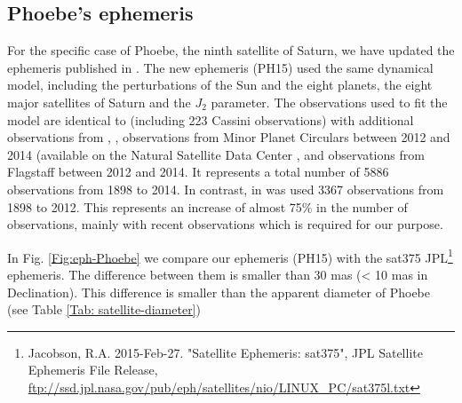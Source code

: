 \documentclass[useAMS,usenatbib]{mn2e}
\begin{document}


\subsection{Phoebe's ephemeris}

For the specific case of Phoebe, the ninth satellite of Saturn, we have updated the ephemeris published in \cite{Desmars2013}. The new ephemeris (PH15) used the same dynamical model, including the perturbations of the Sun and the eight planets, the eight major satellites of Saturn and the $J_2$ parameter. The observations used to fit the model are identical to \cite{Desmars2013} (including 223 Cassini observations) with additional observations from , \cite{Peng2015}, observations from Minor Planet Circulars between 2012 and 2014 (available on the Natural Satellite Data Center \textbf{\citep{Arlot2009}}, and observations from Flagstaff \citep{NOFS} between 2012 and 2014. It represents a total number of 5886 observations from 1898 to 2014. In contrast, in \cite{Desmars2013} was used 3367 observations from 1898 to 2012. This represents an increase of almost 75\% in the number of observations, mainly with recent observations which is required for our purpose.

In Fig. \ref{Fig:eph-Phoebe} we compare our ephemeris (PH15) with the sat375 JPL\footnote{Jacobson, R.A. 2015-Feb-27. "Satellite Ephemeris: sat375", JPL Satellite Ephemeris File Release, \url{ftp://ssd.jpl.nasa.gov/pub/eph/satellites/nio/LINUX_PC/sat375l.txt}} ephemeris. The difference between them is smaller than 30 mas (< 10 mas in Declination). This difference is smaller than the apparent diameter of Phoebe (see Table \ref{Tab: satellite-diameter})
\end{document}
